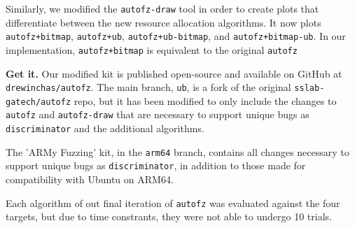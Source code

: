 Similarly, we modified the \texttt{autofz-draw} tool in order to create plots that 
differentiate between the new resource allocation algorithms. It now plots \texttt{autofz+bitmap}, 
\texttt{autofz+ub}, \texttt{autofz+ub-bitmap}, and \texttt{autofz+bitmap-ub}. In our 
implementation, \texttt{autofz+bitmap} is equivalent to the original \texttt{autofz}

\textbf{Get it.} Our modified kit is published open-source and available on GitHub at \texttt{drewinchas/autofz}\cite{york_drewinchasautofz_2024}. 
The main branch, \texttt{ub}, is a fork of the original \texttt{sslab-gatech/autofz}\cite{noauthor_sslab-gatechautofz_2024} 
repo, but it has been modified to only include the changes to \texttt{autofz} and \texttt{autofz-draw} 
that are necessary to support unique bugs as \texttt{discriminator} and the additional algorithms. 

The 'ARMy Fuzzing' kit, in the \texttt{arm64} branch\cite{noauthor_drewinchasautofz_nodate}, contains 
all changes necessary to support unique bugs as \texttt{discriminator}, in addition to those made for 
compatibility with Ubuntu on ARM64. 

Each algorithm of out final iteration of \texttt{autofz} was evaluated against the four targets, but due to time constrants, they
were not able to undergo 10 trials.